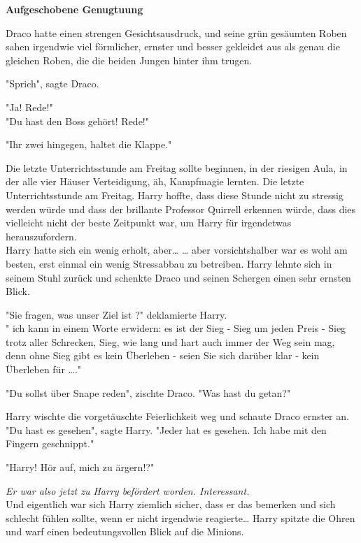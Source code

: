 

\hypertarget{aufgeschobene-genugtuung}{%

\textbf{Aufgeschobene Genugtuung}

Draco hatte einen strengen Gesichtsausdruck, und seine grün gesäumten Roben sahen irgendwie viel förmlicher, ernster und besser gekleidet aus als genau die gleichen Roben, die die beiden Jungen hinter ihm trugen.

"Sprich", sagte Draco.

"Ja! Rede!"\\ "Du hast den Boss gehört! Rede!"

"Ihr zwei hingegen, haltet die Klappe."

Die letzte Unterrichtsstunde am Freitag sollte beginnen, in der riesigen Aula, in der alle vier Häuser Verteidigung, äh, Kampfmagie lernten. Die letzte Unterrichtsstunde am Freitag. Harry hoffte, dass diese Stunde nicht zu stressig werden würde und dass der brillante Professor Quirrell erkennen würde, dass dies vielleicht nicht der beste Zeitpunkt war, um Harry für irgendetwas herauszufordern.\\ Harry hatte sich ein wenig erholt, aber… … aber vorsichtshalber war es wohl am besten, erst einmal ein wenig Stressabbau zu betreiben. Harry lehnte sich in seinem Stuhl zurück und schenkte Draco und seinen Schergen einen sehr ernsten Blick.

"Sie fragen, was unser Ziel ist ?" deklamierte Harry.\\ " ich kann in einem Worte erwidern: es ist der Sieg - Sieg um jeden Preis - Sieg trotz aller Schrecken, Sieg, wie lang und hart auch immer der Weg sein mag, denn ohne Sieg gibt es kein Überleben - seien Sie sich darüber klar - kein Überleben für …."

"Du sollst über Snape reden", zischte Draco. "Was hast du getan?"

Harry wischte die vorgetäuschte Feierlichkeit weg und schaute Draco ernster an.\\ "Du hast es gesehen", sagte Harry. "Jeder hat es gesehen. Ich habe mit den Fingern geschnippt."

"Harry! Hör auf, mich zu ärgern!?"

\emph{Er war also jetzt zu Harry befördert worden. Interessant.}\\ Und eigentlich war sich Harry ziemlich sicher, dass er das bemerken und sich schlecht fühlen sollte, wenn er nicht irgendwie reagierte… Harry spitzte die Ohren und warf einen bedeutungsvollen Blick auf die Minions.

}
